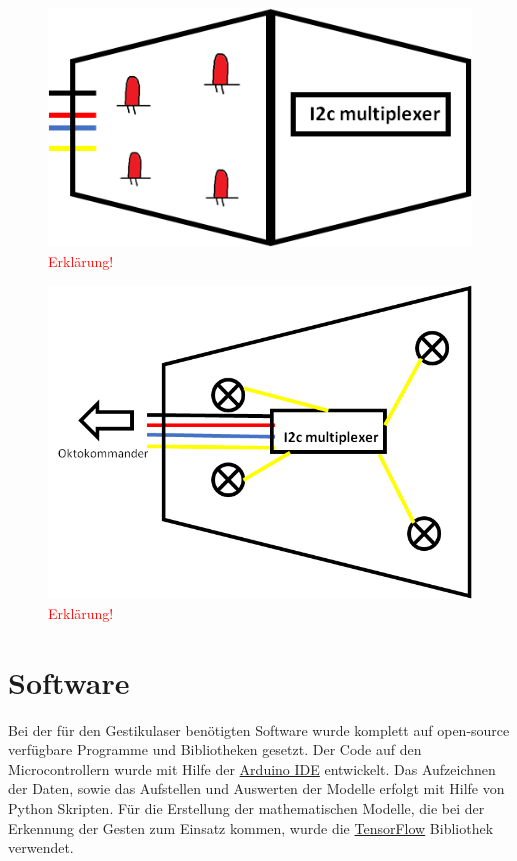 \begin{figure}[h]
	\centering
	\includegraphics[scale=0.7]{../figures/DetektormodulOffen.png}
	\caption{\textcolor{red}{Erklärung!}}
	\label{fig:DetektormodulOffen}
\end{figure}

\begin{figure}[h]
	\centering
	\includegraphics[scale=0.5]{../figures/PrinzipskizzeDetektormodul.png}
	\caption{\textcolor{red}{Erklärung!}}
	\label{fig:PrinzipskizzeDetektormodul}
\end{figure}


\section{Software}
\label{sec:Software}

Bei der für den Gestikulaser benötigten Software wurde komplett auf open-source verfügbare Programme und Bibliotheken gesetzt. Der Code auf den Microcontrollern wurde mit Hilfe der \href{https://www.arduino.cc/en/Main/Software}{Arduino IDE} entwickelt. Das Aufzeichnen der Daten, sowie das Aufstellen und Auswerten der Modelle erfolgt mit Hilfe von Python Skripten. Für die Erstellung der mathematischen Modelle, die bei der Erkennung der Gesten zum Einsatz kommen, wurde die \href{https://www.tensorflow.org/}{TensorFlow\texttrademark} Bibliothek verwendet.